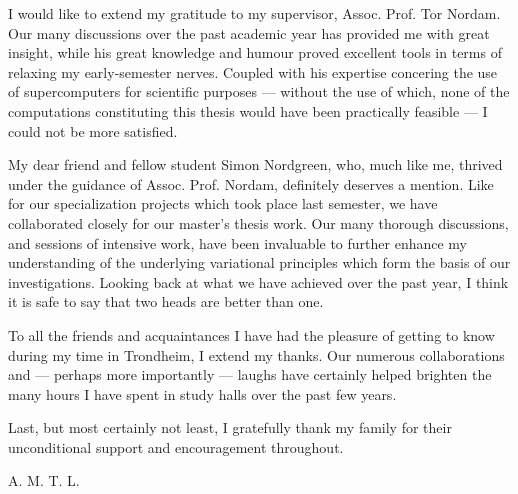 I would like to extend my gratitude to my supervisor, Assoc. Prof. Tor Nordam.
Our many discussions over the past academic year has provided me with great
insight, while his great knowledge and humour proved excellent tools in terms
of relaxing my early-semester nerves. Coupled with his expertise concering the
use of supercomputers for scientific purposes --- without the use of which,
none of the computations constituting this thesis would have been practically
feasible --- I could not be more satisfied.

My dear friend and fellow student Simon Nordgreen, who, much like me, thrived
under the guidance of Assoc. Prof. Nordam, definitely deserves a mention. Like
for our specialization projects which took place last semester, we have
collaborated closely for our master's thesis work. Our many thorough
discussions, and sessions of intensive work, have been invaluable to further
enhance my understanding of the underlying variational principles which form
the basis of our investigations. Looking back at what we have achieved over the
past year, I think it is safe to say that two heads are better than one.

To all the friends and acquaintances I have had the pleasure of getting to know
during my time in Trondheim, I extend my thanks. Our numerous collaborations
and --- perhaps more importantly --- laughs have certainly helped brighten the
many hours I have spent in study halls over the past few years.

Last, but most certainly not least, I gratefully thank my family for their
unconditional support and encouragement throughout.

\begin{minipage}[t]{\textwidth}
\begin{flushright}
A. M. T. L.
\end{flushright}
\end{minipage}
